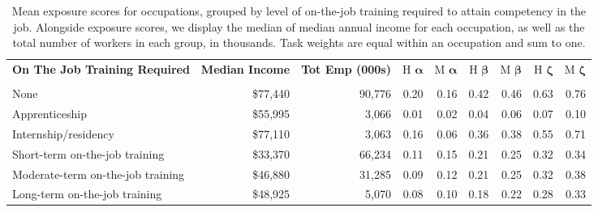 
\begin{table}[]\scriptsize
    \centering
\begin{tabular}{l|rr|rr|rr|rr}
\toprule
{\textbf{On The Job Training Required}} & \textbf{Median Income} & \textbf{Tot Emp (000s)} & H  $\pmb{\alpha}$ &  M $\pmb{\alpha}$ &  H $\pmb{\beta}$ &  M $\pmb{\beta}$ &  H $\pmb{\zeta}$ &  M $\pmb{\zeta}$ \\
 &      &      &      &      &      &      \\
\midrule
None                           &  \$77,440    &   90,776  & 0.20 & 0.16 & 0.42 & 0.46 & 0.63 & 0.76 \\
Apprenticeship                 &  \$55,995    &   3,066  & 0.01 & 0.02 & 0.04 & 0.06 & 0.07 & 0.10 \\
Internship/residency          &  \$77,110    &  3,063  & 0.16 & 0.06 & 0.36 & 0.38 & 0.55 & 0.71 \\
Short-term on-the-job training      & \$33,370     & 66,234  & 0.11 & 0.15 & 0.21 & 0.25 & 0.32 & 0.34 \\
Moderate-term on-the-job training     & \$46,880     &  31,285 & 0.09 & 0.12 & 0.21 & 0.25 & 0.32 & 0.38 \\
Long-term on-the-job training      & \$48,925   & 5,070   & 0.08 & 0.10 & 0.18 & 0.22 & 0.28 & 0.33 \\
\bottomrule
\end{tabular}
    \caption{Mean exposure scores for occupations, grouped by level of on-the-job training required to attain competency in the job. Alongside exposure scores, we display the median of median annual income for each occupation, as well as the total number of workers in each group, in thousands. Task weights are equal within an occupation and sum to one.}
    \label{tab:on_the_job_training}
\end{table}
